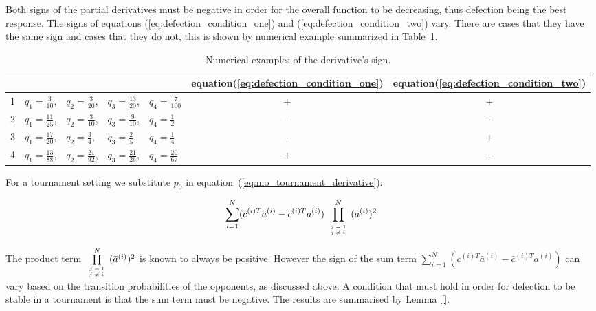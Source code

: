 \documentclass[10pt]{article}
\begin{document}
Both signs of the partial derivatives must be negative in order for the overall
function to be decreasing, thus defection being the best response.
The signs of equations (\ref{eq:defection_condition_one}) and (\ref{eq:defection_condition_two})
vary. There are cases that they have the same sign and cases that they do not,
this is shown by numerical example summarized in Table~\ref{table:sign_of_derivative}.

\begin{table}[htbp]
\begin{center}
\begin{tabular}{cllllcc}
    \toprule
    {}& {} & {}& {}& {}&  equation(\ref{eq:defection_condition_one}) &  equation(\ref{eq:defection_condition_two}) \\
    \midrule
1 & \(q_1=\frac{3}{10}\),   & \(q_2=\frac{3}{20}\),  & \(q_3=\frac{13}{20}\), & \(q_4=\frac{7}{100}\)
&  + & + \\
2 & \(q_1=\frac{11}{25}\),  & \(q_2=\frac{3}{10}\),  & \(q_3=\frac{9}{10}\),  & \(q_4=\frac{1}{2}\)
&  - & - \\
3 & \(q_1=\frac{17}{20}\),  & \(q_2=\frac{3}{4}\),   & \(q_3=\frac{2}{5}\),   & \(q_4=\frac{1}{4}\)
&  - & + \\
4 & \(q_1=\frac{13}{88}\),  & \(q_2=\frac{21}{92}\),  & \(q_3=\frac{21}{26}\),  & \(q_4=\frac{20}{67}\)
&  + & - \\
    \bottomrule
\end{tabular}
\end{center}
\caption{Numerical examples of the derivative's sign.}
\label{table:sign_of_derivative}
\end{table}

For a tournament setting we substitute \(p_0\) in equation~(\ref{eq:mo_tournament_derivative}):

\begin{equation}
\sum_{i=1} ^ N (c^{(i)T} \bar{a}^{(i)} - \bar{c}^{(i)T} a^{(i)})
\prod\limits_{\tiny\begin{array}{l} j=1 \\ j \neq i \end{array}} ^ N (\bar{a}^{(i)})^2
\end{equation}

The product term \(\prod\limits_{\tiny\begin{array}{l} j=1 \\ j \neq i \end{array}} ^ N (\bar{a}^{(i)})^2\)
is known to always be positive. However the sign of the sum term 
\(\sum_{i=1} ^ N (c^{(i)T} \bar{a}^{(i)} - \bar{c}^{(i)T} a^{(i)})\) can vary based
on the transition probabilities of the opponents, as discussed above. A condition that
must hold in order for defection to be stable in a tournament is that the sum term
must be negative. The results are summarised by Lemma~\ref{}.
\end{document}
